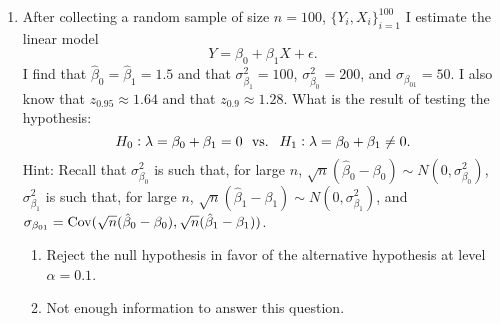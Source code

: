 \documentclass[10pt]{article}
\begin{document}
\begin{enumerate}
	\item After collecting a random sample of size \(n=100\), \(\{Y_i,X_i\}_{i=1}^{100}\) I estimate the linear model \[ Y = \beta_0 + \beta_1X + \epsilon.\] I find that \(\hat\beta_0 = \hat\beta_1 = 1.5\) and that  \(\sigma_{\beta_1}^2 = 100\),  \(\sigma_{\beta_0}^2 = 200\), and  \(\sigma_{\beta_{01}} = 50\). I also know that \(z_{0.95} \approx 1.64\) and that \(z_{0.9} \approx 1.28\). What is the result of testing the hypothesis:
	\[H_0: \lambda = \beta_0 + \beta_1 = 0\hbox{ }\text{ vs. }\hbox{ }H_1: \lambda = \beta_0 + \beta_1 \neq 0.\]Hint: Recall that \(\sigma_{\beta_0}^2\) is such that, for large \(n\), \(\sqrt{n}(\hat\beta_0 - \beta_0)\sim N(0,\sigma_{\beta_0}^2)\), \(\sigma_{\beta_1}^2\) is such that, for large  \(n\),  \(\sqrt{n}(\hat\beta_1 - \beta_1)\sim N(0,\sigma_{\beta_1}^2)\), and  \(\sigma_{\beta_{01}} = \operatorname{Cov}(\sqrt{n}(\hat\beta_0 -\beta_0), \sqrt{n}(\hat\beta_1 -\beta_1))\).
	\begin{enumerate}
		\item Reject the null hypothesis in favor of the alternative hypothesis at level \(\alpha = 0.1\).
		\item Not enough information to answer this question.
	\end{enumerate}
	 



\end{enumerate}
\end{document}
